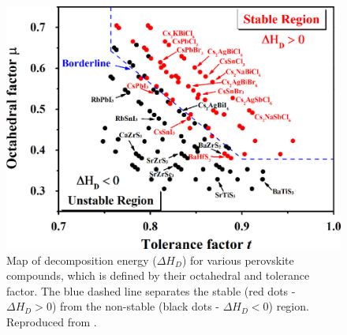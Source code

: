 \begin{figure}[htbp]
  \centering
  \medskip
  \includegraphics[width=.67\textwidth]{chapters/introduction/image/perovskite_stability.jpeg}
  \caption[Stability of various perovskite compositions as a function of their octahedral and tolerance factors.]{Map of decomposition energy ($\Delta H_D$) for various perovskite compounds, which is defined by their octahedral and tolerance factor. The blue dashed line separates the stable (red dots - $\Delta H_D>0$) from the non-stable (black dots - $\Delta H_D<0$) region. Reproduced from \cite{Sun2017ThermodynamicPerovskites}.}
  \label{fig:ch2:perovskite_stable_region}
\end{figure}

